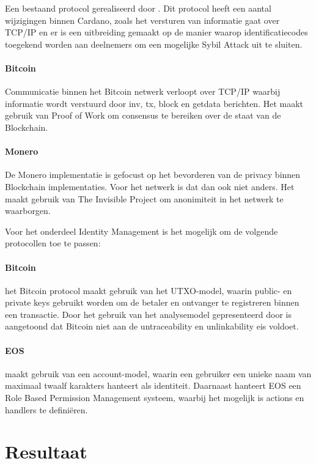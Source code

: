 Een bestaand protocol gerealiseerd door \cite{maymounkov2002kademlia}. Dit protocol heeft een aantal wijzigingen binnen Cardano, zoals het versturen van informatie gaat over TCP/IP en er is een uitbreiding gemaakt op de manier waarop identificatiecodes toegekend worden aan deelnemers om een mogelijke Sybil Attack uit te sluiten.

\paragraph{Bitcoin}

Communicatie binnen het Bitcoin netwerk verloopt over TCP/IP waarbij informatie wordt verstuurd door inv, tx, block en getdata berichten. Het maakt gebruik van Proof of Work om consensus te bereiken over de staat van de Blockchain.

\paragraph{Monero}

De Monero implementatie is gefocust op het bevorderen van de privacy binnen Blockchain implementaties. Voor het netwerk is dat dan ook niet anders. Het maakt gebruik van The Invisible Project om anonimiteit in het netwerk te waarborgen.

Voor het onderdeel Identity Management is het mogelijk om de volgende protocollen toe te passen:

\paragraph{Bitcoin} het Bitcoin protocol maakt gebruik van het UTXO-model, waarin public- en private keys gebruikt worden om de betaler en ontvanger te registreren binnen een transactie. Door het gebruik van het analysemodel gepresenteerd door \cite{reid2013analysis} is aangetoond dat Bitcoin niet aan de untraceability en unlinkability eis voldoet.

\paragraph{EOS} maakt gebruik van een account-model, waarin een gebruiker een unieke naam van maximaal twaalf karakters hanteert als identiteit. Daarnaast hanteert EOS een Role Based Permission Management systeem, waarbij het mogelijk is actions en handlers te definiëren.

\section{Resultaat}


